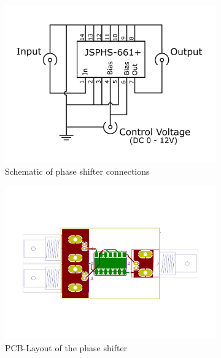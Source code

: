 \begin{description}
\end{description}

\begin{figure}[ht]
	\centering
	\begin{subfigure}{0.4\textwidth}
		\centering
		\includegraphics[width=\textwidth]{Chapters/Deflection/circuit_phase4zu3}
		\caption{Schematic of phase shifter connections}
		\label{fig:circuit_phase}
	\end{subfigure}
	\hspace{0.1\textwidth}
	\begin{subfigure}{0.4\textwidth}
		\centering
		\includegraphics[width=\textwidth]{Chapters/Deflection/PCB_phase3}
		\caption{PCB-Layout of the phase shifter}
		\label{fig:PCB_phase}
	\end{subfigure}
	\caption{}
	\label{fig:PhaseShifter}
\end{figure}




